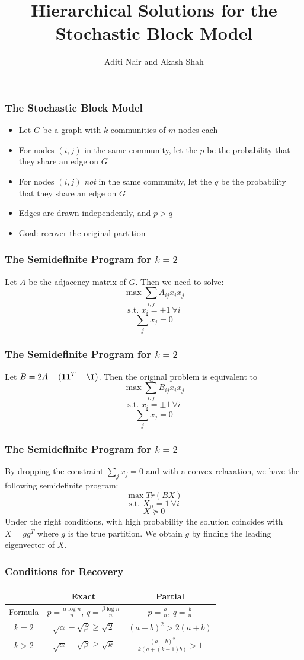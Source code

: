 \documentclass[10pt]{beamer}
\title{Hierarchical Solutions for the Stochastic Block Model}
\author{Aditi Nair and Akash Shah}
\begin{document}
\maketitle

\begin{frame}
\frametitle{The Stochastic Block Model}
\begin{itemize}
\item{Let $G$ be a graph with $k$ communities of $m$ nodes each}
\item{For nodes $(i,j)$ in the same community, let the $p$ be the probability that they share an edge on $G$}
\item{For nodes $(i,j)$ \textit{not} in the same community, let the $q$ be the probability that they share an edge on $G$}
\item{Edges are drawn independently, and $p>q$}
\item{Goal: recover the original partition}
\end{itemize}
\end{frame}

\begin{frame}
\frametitle{The Semidefinite Program for $k=2$}
Let $A$ be the adjacency matrix of $G$. Then we need to solve:
$$\max \sum_{i,j} A_{ij} x_{i} x_{j} $$
$$ \text{s.t. } x_i = \pm 1 \ \forall i$$
$$\sum_j x_j = 0$$
\end{frame}

\begin{frame}
\frametitle{The Semidefinite Program for $k=2$}
Let $B = 2A - (\textbf{1}\textbf{1}^T - \I)$. Then the original problem is equivalent to
$$\max \sum_{i,j} B_{ij} x_{i} x_{j} $$
$$ \text{s.t. } x_i = \pm 1 \ \forall i$$
$$\sum_j x_j = 0$$
\end{frame}

\begin{frame}
\frametitle{The Semidefinite Program for $k=2$}
By dropping the constraint $\sum_j x_j = 0$ and with a convex relaxation, we have the following semidefinite program:
$$\max Tr(BX)$$
$$ \text{s.t. } X_{ii}= 1 \ \forall i$$
$$X \succeq 0$$
Under the right conditions, with high probability the solution coincides with $X=gg^{T}$ where $g$ is the true partition. We obtain $g$ by finding the leading eigenvector of $X$.
\end{frame}

\begin{frame}
\frametitle{Conditions for Recovery}
\begin{tabular}{c | c | c }
 & Exact & Partial \\ \hline
 Formula & $p = \frac{\alpha \log n}{n}$, $q = \frac{\beta \log n}{n}$ & $p = \frac{a}{n}$, $q = \frac{b}{n}$ \\ \hline
$k = 2$ & $\sqrt{\alpha} - \sqrt{\beta} \geq \sqrt{2}$ & $(a-b)^2 > 2(a+b)$ \\ 
$k > 2$ &  $\sqrt{\alpha} - \sqrt{\beta} \geq \sqrt{k}$ & $\frac{(a-b)^2}{k(a+(k-1)b)} > 1$ \\ \hline
 \end{tabular}
\end{frame}
\end{document}
